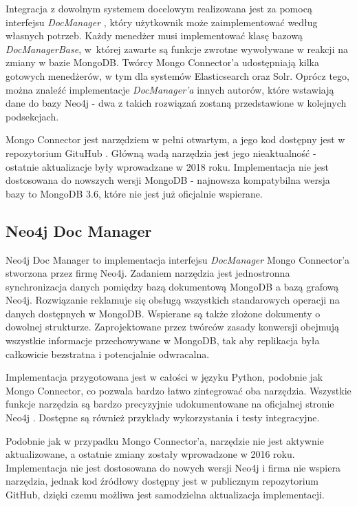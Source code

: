 \documentclass[a4paper,twoside,12pt]{book}
\begin{document}
Integracja z dowolnym systemem docelowym realizowana jest za pomocą interfejsu \textit{DocManager} \cite{bib:mongo-connector-doc-manager}, który użytkownik może zaimplementować według własnych potrzeb. Każdy menedżer musi implementować klasę bazową \textit{DocManagerBase}, w~której zawarte są funkcje zwrotne wywoływane w reakcji na zmiany w bazie MongoDB. Twórcy Mongo Connector'a udostępniają kilka gotowych menedżerów, w tym dla systemów Elasticsearch oraz Solr. Oprócz tego, można znaleźć implementacje \textit{DocManager'a} innych autorów, które wstawiają dane do bazy Neo4j - dwa z takich rozwiązań zostaną przedstawione w kolejnych podsekcjach.

Mongo Connector jest narzędziem w pełni otwartym, a jego kod dostępny jest w repozytorium GituHub \cite{bib:mongo-connector-github}. Główną wadą narzędzia jest jego nieaktualność - ostatnie aktualizacje były wprowadzane w 2018 roku. Implementacja nie jest dostosowana do nowszych wersji MongoDB - najnowsza kompatybilna wersja bazy to MongoDB 3.6, które nie jest już oficjalnie wspierane.

\vspace{0.6cm}

\subsection{Neo4j Doc Manager}

Neo4j Doc Manager \cite{bib:neo4j-doc-manager-github} to implementacja interfejsu \textit{DocManager} Mongo Connector'a stworzona przez firmę Neo4j. Zadaniem narzędzia jest jednostronna synchronizacja danych pomiędzy bazą dokumentową MongoDB a bazą grafową Neo4j. Rozwiązanie reklamuje się obsługą wszystkich standarowych operacji na danych dostępnych w MongoDB. Wspierane są także złożone dokumenty o dowolnej strukturze. Zaprojektowane przez twórców zasady konwersji obejmują wszystkie informacje przechowywane w MongoDB, tak aby replikacja była całkowicie bezstratna i potencjalnie odwracalna. 

Implementacja przygotowana jest w całości w języku Python, podobnie jak Mongo Connector, co pozwala bardzo łatwo zintegrować oba narzędzia. Wszystkie funkcje narzędzia są bardzo precyzyjnie udokumentowane na oficjalnej stronie Neo4j \cite{bib:neo4j-doc-manager}. Dostępne są również przykłady wykorzystania i testy integracyjne. 

Podobnie jak w przypadku Mongo Connector'a, narzędzie nie jest aktywnie aktualizowane, a ostatnie zmiany zostały wprowadzone w 2016 roku. Implementacja nie jest dostosowana do nowych wersji Neo4j i firma nie wspiera narzędzia, jednak kod źródłowy dostępny jest w publicznym repozytorium GitHub, dzięki czemu możliwa jest samodzielna aktualizacja implementacji.
\end{document}
